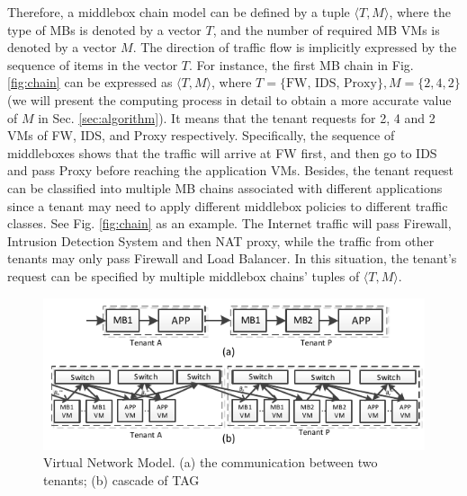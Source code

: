 \documentclass[review]{elsarticle}
\begin{document}

Therefore, a middlebox chain model can be defined by a tuple $\langle T, M \rangle$, where the type of MBs is denoted by a vector $T$, and the number of required MB VMs is denoted by a vector $M$. The direction of traffic flow is implicitly expressed by the sequence of items in the vector $T$. For instance, the first MB chain in Fig. \ref{fig:chain} can be expressed as $\langle T, M \rangle$, where $T=\{\text{FW, IDS, Proxy}\}, M=\{2, 4, 2\}$ (we will present the computing process in detail to obtain a more accurate value of $M$ in Sec. \ref{sec:algorithm}). It means that the tenant requests for 2, 4 and 2 VMs of FW, IDS, and Proxy respectively. Specifically, the sequence of middleboxes shows that the traffic will arrive at FW first, and then go to IDS and pass Proxy before reaching the application VMs. Besides, the tenant request can be classified into multiple MB chains associated with different applications \cite{stratos12, M14sap, nfv_challenges} since a tenant may need to apply different middlebox policies to different traffic classes. See Fig. \ref{fig:chain} as an example. The Internet traffic will pass Firewall, Intrusion Detection System and then NAT proxy, while the traffic from other tenants may only pass Firewall and Load Balancer. In this situation, the tenant's request can be specified by multiple middlebox chains' tuples of $\langle T, M \rangle$.
\begin{figure}
	\centering
	\includegraphics[width=4.5 in]{fig/abstraction.pdf}
	\caption{Virtual Network Model. (a) the communication between two tenants; (b) cascade of TAG}
	\label{fig:abstraction}
\end{figure}
\end{document}
